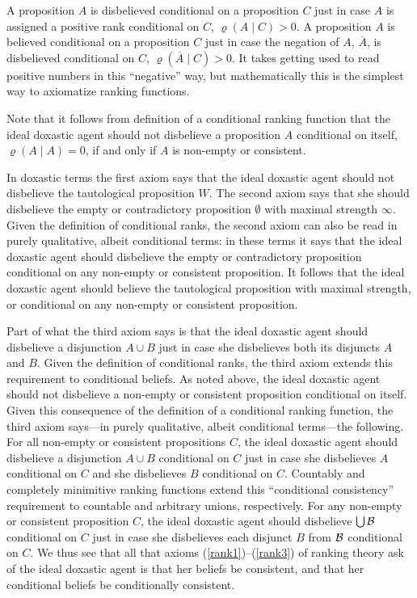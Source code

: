 A proposition $A$ is disbelieved conditional on a proposition $C$ just in case $A$ is assigned a positive rank conditional on $C$, $\varrho\left(A\mid C\right)>0$. A proposition $A$ is believed conditional on a proposition $C$ just in case the negation of $A$, $\overline{A}$, is disbelieved conditional on $C$, $\varrho\left(\overline{A}\mid C\right)>0$. It takes getting used to read positive numbers in this ``negative'' way, but mathematically this is the simplest way to axiomatize ranking functions.

Note that it follows from  definition of a conditional ranking function that the ideal doxastic agent should not disbelieve a proposition $A$ conditional on itself, $\varrho\left(A\mid A\right)=0$, if and only if $A$ is non-empty or consistent.

In doxastic terms the first axiom says that the ideal doxastic agent should not disbelieve the tautological proposition $W$. The second axiom says that she should disbelieve the empty or contradictory proposition $\emptyset$ with maximal strength $\infty$. Given the definition of conditional ranks, the second axiom can also be read in purely qualitative, albeit conditional terms: in these terms it says that the ideal doxastic agent should disbelieve the empty or contradictory proposition conditional on any non-empty or consistent proposition. It follows that the ideal doxastic agent should believe the tautological proposition with maximal strength, or conditional on any non-empty or consistent proposition.

Part of what the third axiom says is that the ideal doxastic agent should %
disbelieve a disjunction $A\cup B$ just in case she %
disbelieves both its disjuncts $A$ and $B$. Given the definition of conditional ranks, the third axiom extends this requirement to conditional beliefs. As noted above, the ideal doxastic agent should not disbelieve a non-empty or consistent proposition conditional on itself. Given this consequence of the definition of a conditional ranking function, the third axiom says---in purely qualitative, albeit conditional terms---the following. For all non-empty or consistent propositions $C$, the ideal doxastic agent should disbelieve a disjunction $A\cup B$ conditional on $C$ just in case she disbelieves $A$ conditional on $C$ and she disbelieves $B$ conditional on $C$. Countably and completely minimitive ranking functions extend this ``conditional consistency'' requirement to countable and arbitrary unions, respectively. For any non-empty or consistent proposition $C$, the ideal doxastic agent should disbelieve $\bigcup\cal B$ conditional on $C$ just in case she disbelieves each disjunct $B$ from $\cal B$ conditional on $C$. We thus see that all that axioms (\ref{rank1})--(\ref{rank3}) of ranking theory ask of the ideal doxastic agent is that her beliefs be consistent, and that her conditional beliefs be conditionally consistent.

